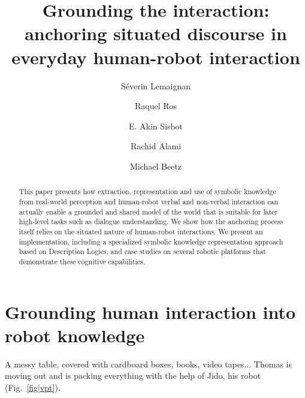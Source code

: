 \documentclass[twocolumn]{svjour3}
\begin{document}

\title{Grounding the interaction: anchoring situated discourse in everyday human-robot interaction}

\author{
S\'everin Lemaignan \and
Raquel Ros \and
E. Akin Sisbot \and
Rachid Alami \and
Michael Beetz
}


\maketitle

\begin{abstract}
This paper presents how extraction, representation and use of symbolic
knowledge from real-world perception and human-robot verbal and non-verbal
interaction can actually enable a grounded and shared model of the world that
is suitable for later high-level tasks such as dialogue understanding. We show how
the anchoring process itself relies on the situated nature of human-robot
interactions. We present an implementation, including a specialized symbolic
knowledge representation approach based on Description Logics, and case studies
on several robotic platforms that demonstrate these cognitive capabilities.
\end{abstract}

\section{Grounding human interaction into robot knowledge}


A messy table, covered with cardboard boxes, books, video tapes... Thomas is
moving out and is packing everything with the help of Jido, his robot
(Fig.~\ref{fig|vpt}).
\end{document}

